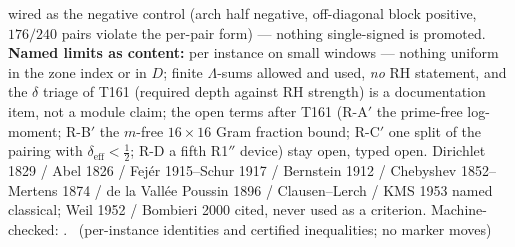 wired as the negative control (arch half negative, off-diagonal block
positive, $176/240$ pairs violate the per-pair form) --- nothing
single-signed is promoted.
\textbf{Named limits as content:} per instance on small windows ---
nothing uniform in the zone index or in $D$; finite $\Lambda$-sums
allowed and used, \emph{no} RH statement, and the $\delta$ triage of
T161 (required depth against RH strength) is a documentation item, not a
module claim; the open terms after T161 (R-A$'$ the prime-free
log-moment; R-B$'$ the $m$-free $16\times16$ Gram fraction bound; R-C$'$
one split of the pairing with $\delta_{\mathrm{eff}}<\tfrac12$; R-D a
fifth R1$''$ device) stay open, typed open.
Dirichlet 1829 / Abel 1826 / Fej\'er 1915--Schur 1917 / Bernstein 1912 /
Chebyshev 1852--Mertens 1874 / de la Vall\'ee Poussin 1896 /
Clausen--Lerch / KMS 1953 named classical; Weil 1952 / Bombieri 2000
cited, never used as a criterion.
Machine-checked:
.
\mE\ (per-instance identities and certified inequalities; no marker moves)


